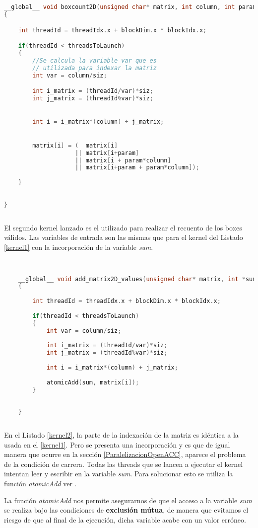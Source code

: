 \newpage
\begin{lstlisting}[language=C++,caption={Kernel boxcount2D},label=kernel1]


__global__ void boxcount2D(unsigned char* matrix, int column, int param, int siz, int threadsToLaunch)
{

    int threadId = threadIdx.x + blockDim.x * blockIdx.x;

    if(threadId < threadsToLaunch)
    {
        //Se calcula la variable var que es 
        // utilizada para indexar la matriz
        int var = column/siz;

        int i_matrix = (threadId/var)*siz;
        int j_matrix = (threadId%var)*siz;

    
        int i = i_matrix*(column) + j_matrix;


        matrix[i] = (  matrix[i] 
                    || matrix[i+param] 
                    || matrix[i + param*column] 
                    || matrix[i+param + param*column]);
        
    }
 
    
}
    
\end{lstlisting}

El segundo kernel lanzado es el utilizado para realizar el recuento de los boxes válidos. Las variables de entrada son las mismas que para el kernel del Listado \ref{kernel1} con la incorporación de la variable \textit{sum}.
\newpage
\begin{lstlisting}[language=C++,caption={Kernel para la acumulación de boxes válidos},label=kernel2]


    __global__ void add_matrix2D_values(unsigned char* matrix, int *sum, int column, int siz, int threadsToLaunch)
    {
    
        int threadId = threadIdx.x + blockDim.x * blockIdx.x;
    
        if(threadId < threadsToLaunch)
        {
            int var = column/siz;
    
            int i_matrix = (threadId/var)*siz;
            int j_matrix = (threadId%var)*siz;
    
            int i = i_matrix*(column) + j_matrix;
        
            atomicAdd(sum, matrix[i]);
        }
            
    
    }
        
\end{lstlisting}

En el Listado \ref{kernel2}, la parte de la indexación de la matriz es idéntica a la usada en el \ref{kernel1}. Pero se presenta una incorporación y es que de igual manera que ocurre en la sección \ref{ParalelizacionOpenACC}, aparece el problema de la condición de carrera. Todas las threads que se lancen a ejecutar el kernel intentan leer y escribir en la variable \textit{sum}. Para solucionar esto se utiliza la función \textit{atomicAdd} ver \cite{unknown-author-2021H}.

La función \textit{atomicAdd} nos permite asegurarnos de que el acceso a la variable \textit{sum} se realiza bajo las condiciones de \textbf{exclusión mútua}, de manera que evitamos el riesgo de que al final de la ejecución, dicha variable acabe con un valor erróneo.